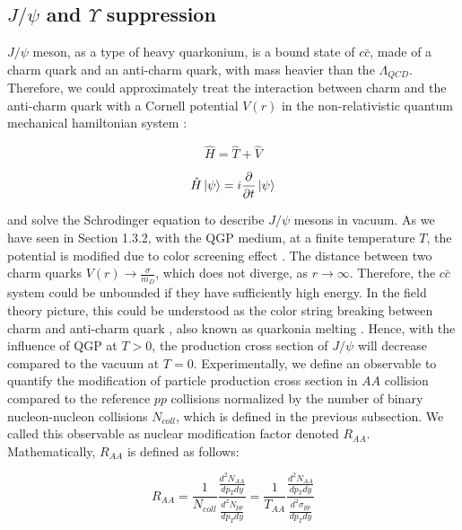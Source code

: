 \subsection{$J/\psi$ and $\Upsilon$ suppression} 

$J/\psi$ meson, as a type of heavy quarkonium, is a bound state of $c\bar c$, made of a charm quark and an anti-charm quark, with mass heavier than the $\Lambda_{QCD}$. Therefore, we could approximately treat the interaction between charm and the anti-charm quark with a Cornell potential $V(r)$ in the non-relativistic quantum mechanical hamiltonian system \cite{QuarkoniaV}: 

\begin{equation}
\hat H = \hat T + \hat V
\end{equation}

\begin{equation}
\hat H \ket{\psi} = i \frac{\partial}{\partial t}  \ket{\psi} 
\end{equation}

and solve the Schrodinger equation to describe $J/\psi$ mesons in vacuum. As we have seen in Section 1.3.2, with the QGP medium, at a finite temperature $T$, the potential is modified due to color screening effect \cite{QCDString}. The distance between two charm quarks $V(r) \rightarrow \frac{\sigma}{m_D}$, which does not diverge, as $r \rightarrow \infty$. Therefore, the $c \bar c$ system could be unbounded if they have sufficiently high energy. In the field theory picture, this could be understood as the color string breaking between charm and anti-charm quark \cite{CSBQQ}, also known as quarkonia melting \cite{QQMelt}. Hence, with the influence of QGP at $T > 0$, the production cross section of $J/\psi$ will decrease compared to the vacuum at $T=0$. Experimentally, we define an observable to quantify the modification of particle production cross section in $AA$ collision compared to the reference $pp$ collisions normalized by the number of binary nucleon-nucleon collisions $N_{coll}$, which is defined in the previous subsection. We called this observable as nuclear modification factor denoted $R_{AA}$. Mathematically, $R_{AA}$ is defined as follows:

\begin{equation}
R_{AA} =\frac{1}{N_{coll}} \frac{\frac{d^2N_{AA}}{dp_T dy}}{\frac{d^2N_{pp}}{dp_T dy}} = \frac{1}{T_{AA}} \frac{\frac{d^2N_{AA}}{dp_T dy}}{\frac{d^2\sigma_{pp}}{dp_T dy}}
\end{equation}

